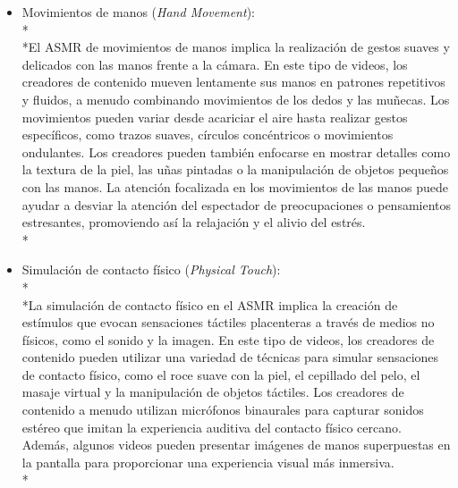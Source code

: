 \documentclass[a4paper,12pt,twoside]{memoir}
\begin{document}
\begin{itemize}
\begin{itemize}
    \item Movimientos de manos (\textit{Hand Movement}): \\*\\*El ASMR de movimientos de manos implica la realización de gestos suaves y delicados con las manos frente a la cámara. En este tipo de videos, los creadores de contenido mueven lentamente sus manos en patrones repetitivos y fluidos, a menudo combinando movimientos de los dedos y las muñecas. Los movimientos pueden variar desde acariciar el aire hasta realizar gestos específicos, como trazos suaves, círculos concéntricos o movimientos ondulantes. Los creadores pueden también enfocarse en mostrar detalles como la textura de la piel, las uñas pintadas o la manipulación de objetos pequeños con las manos. La atención focalizada en los movimientos de las manos puede ayudar a desviar la atención del espectador de preocupaciones o pensamientos estresantes, promoviendo así la relajación y el alivio del estrés.\\*

    \item Simulación de contacto físico (\textit{Physical Touch}):\\*\\*La simulación de contacto físico en el ASMR implica la creación de estímulos que evocan sensaciones táctiles placenteras a través de medios no físicos, como el sonido y la imagen. En este tipo de videos, los creadores de contenido pueden utilizar una variedad de técnicas para simular sensaciones de contacto físico, como el roce suave con la piel, el cepillado del pelo, el masaje virtual y la manipulación de objetos táctiles. Los creadores de contenido a menudo utilizan micrófonos binaurales para capturar sonidos estéreo que imitan la experiencia auditiva del contacto físico cercano. Además, algunos videos pueden presentar imágenes de manos superpuestas en la pantalla para proporcionar una experiencia visual más inmersiva.\\*



\end{itemize}
\end{itemize}
\end{document}
